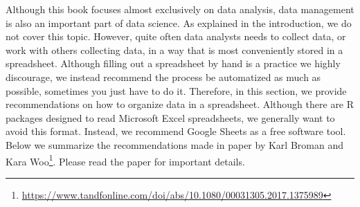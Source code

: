\documentclass[
]{krantz}
\begin{document}
Although this book focuses almost exclusively on data analysis, data management is also an important part of data science. As explained in the introduction, we do not cover this topic. However, quite often data analysts needs to collect data, or work with others collecting data, in a way that is most conveniently stored in a spreadsheet. Although filling out a spreadsheet by hand is a practice we highly discourage, we instead recommend the process be automatized as much as possible, sometimes you just have to do it. Therefore, in this section, we provide recommendations on how to organize data in a spreadsheet. Although there are R packages designed to read Microsoft Excel spreadsheets, we generally want to avoid this format. Instead, we recommend Google Sheets as a free software tool. Below
we summarize the recommendations made in paper by Karl Broman and Kara Woo\footnote{\url{https://www.tandfonline.com/doi/abs/10.1080/00031305.2017.1375989}}. Please read the paper for important details.
\end{document}
